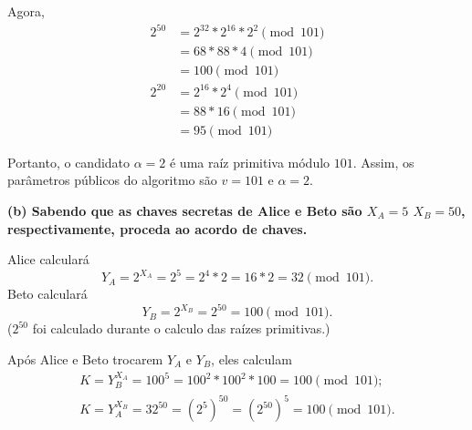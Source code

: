 \documentclass{article}
\begin{document}
Agora,
\begin{align*}
    2^{50} &= 2^{32} * 2^{16} * 2^2 \pmod{101} \\
           &= 68 * 88 * 4 \pmod{101} \\
           &= 100 \pmod{101} \\
    2^{20} &= 2^{16} * 2^4 \pmod{101} \\
           &= 88 * 16 \pmod{101} \\
           &= 95 \pmod{101}
\end{align*}

Portanto, o candidato $\alpha = 2$ é uma raíz primitiva módulo $101$.
Assim,
os parâmetros públicos do algoritmo são $v = 101$ e $\alpha = 2$.

\textbf{
    (b)  Sabendo que as chaves secretas de Alice e Beto são $X_A = 5$
    $X_B = 50$, respectivamente,
    proceda ao acordo de chaves.
}

Alice calculará
\begin{equation*}
    Y_A = 2^{X_A} = 2^5 = 2^4 * 2 = 16*2 = 32 \pmod{101}.
\end{equation*}
Beto calculará
\begin{equation*}
    Y_B = 2^{X_B} = 2^{50} = 100 \pmod{101}.
\end{equation*}
($2^{50}$ foi calculado durante o calculo das raízes primitivas.)

Após Alice e Beto trocarem $Y_A$ e $Y_B$, eles calculam
\begin{align*}
    K = Y_B^{X_A} = 100^5 = 100^2 * 100^2 * 100 = 100 \pmod{101}; \\
    K = Y_A^{X_B} = 32^{50} = (2^5)^{50} = (2^{50})^5 = 100 \pmod{101}.
\end{align*}
\end{document}
